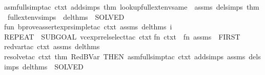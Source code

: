 \begin{isabellebody}
{\isacharparenleft}{\kern0pt}asm{\isacharunderscore}{\kern0pt}full{\isacharunderscore}{\kern0pt}simp{\isacharunderscore}{\kern0pt}tac\ {\isacharparenleft}{\kern0pt}{\isacharparenleft}{\kern0pt}ctxt\ addsimps\ {\isacharparenleft}{\kern0pt}{\isacharat}{\kern0pt}{\isacharbraceleft}{\kern0pt}thm\ lookup{\isacharunderscore}{\kern0pt}full{\isacharunderscore}{\kern0pt}ext{\isacharunderscore}{\kern0pt}env{\isacharunderscore}{\kern0pt}same{\isacharbraceright}{\kern0pt}\ {\isacharcolon}{\kern0pt}{\isacharcolon}{\kern0pt}\ assms{\isacharparenright}{\kern0pt}\ delsimps\ {\isacharparenleft}{\kern0pt}{\isacharat}{\kern0pt}{\isacharbraceleft}{\kern0pt}thm\ full{\isacharunderscore}{\kern0pt}ext{\isacharunderscore}{\kern0pt}env{\isachardot}{\kern0pt}simps{\isacharbraceright}{\kern0pt}\ {\isacharcolon}{\kern0pt}{\isacharcolon}{\kern0pt}\ del{\isacharunderscore}{\kern0pt}thms{\isacharparenright}{\kern0pt}{\isacharparenright}{\kern0pt}{\isacharparenright}{\kern0pt}\ {\isacharbar}{\kern0pt}{\isachargreater}{\kern0pt}\ SOLVED{\isacharprime}{\kern0pt}{\isacharparenright}{\kern0pt}\isanewline
\isanewline
fun\ b{\isacharunderscore}{\kern0pt}prove{\isacharunderscore}{\kern0pt}assert{\isacharunderscore}{\kern0pt}expr{\isacharunderscore}{\kern0pt}simple{\isacharunderscore}{\kern0pt}tac\ ctxt\ assms\ del{\isacharunderscore}{\kern0pt}thms\ i\ {\isacharequal}{\kern0pt}\isanewline
REPEAT\ {\isacharparenleft}{\kern0pt}\ {\isacharparenleft}{\kern0pt}SUBGOAL\ {\isacharparenleft}{\kern0pt}vc{\isacharunderscore}{\kern0pt}expr{\isacharunderscore}{\kern0pt}rel{\isacharunderscore}{\kern0pt}select{\isacharunderscore}{\kern0pt}tac\ ctxt\isanewline
{\isacharparenleft}{\kern0pt}fn\ ctxt\ {\isacharequal}{\kern0pt}{\isachargreater}{\kern0pt}\ fn\ assms\ {\isacharequal}{\kern0pt}{\isachargreater}{\kern0pt}\ FIRST{\isacharprime}{\kern0pt}\ {\isacharbrackleft}{\kern0pt}\isanewline
red{\isacharunderscore}{\kern0pt}var{\isacharunderscore}{\kern0pt}tac\ ctxt\ assms\ del{\isacharunderscore}{\kern0pt}thms{\isacharcomma}{\kern0pt}\isanewline
resolve{\isacharunderscore}{\kern0pt}tac\ ctxt\ {\isacharbrackleft}{\kern0pt}{\isacharat}{\kern0pt}{\isacharbraceleft}{\kern0pt}thm\ RedBVar{\isacharbraceright}{\kern0pt}{\isacharbrackright}{\kern0pt}\ THEN{\isacharprime}{\kern0pt}\ {\isacharparenleft}{\kern0pt}asm{\isacharunderscore}{\kern0pt}full{\isacharunderscore}{\kern0pt}simp{\isacharunderscore}{\kern0pt}tac\ {\isacharparenleft}{\kern0pt}{\isacharparenleft}{\kern0pt}ctxt\ addsimps\ assms\ delsimps\ del{\isacharunderscore}{\kern0pt}thms{\isacharparenright}{\kern0pt}{\isacharparenright}{\kern0pt}\ {\isacharbar}{\kern0pt}{\isachargreater}{\kern0pt}\ SOLVED{\isacharprime}{\kern0pt}{\isacharparenright}{\kern0pt}{\isacharcomma}{\kern0pt}\isanewline

\end{isabellebody}
